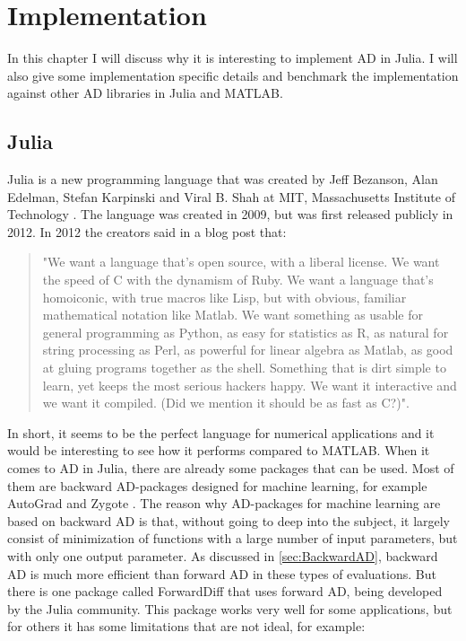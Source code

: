 \chapter{Implementation}
In this chapter I will discuss why it is interesting to implement AD in Julia. I will also give some implementation specific details and benchmark the implementation against other AD libraries in Julia and MATLAB.
\label{ch:Implementation}
\section{Julia}
\label{sec:Julia}
Julia is a new programming language that was created by Jeff Bezanson, Alan Edelman, Stefan Karpinski and Viral B. Shah at MIT, Massachusetts Institute of Technology \emph{\citep{juliaLab}}. The language was created in 2009, but was first released publicly in 2012. In 2012 the creators said in a blog post that:
\begin{quotation}
"We want a language that’s open source, with a liberal license. We want the speed of C with the dynamism of Ruby. We want a language that’s homoiconic, with true macros like Lisp, but with obvious, familiar mathematical notation like Matlab. We want something as usable for general programming as Python, as easy for statistics as R, as natural for string processing as Perl, as powerful for linear algebra as Matlab, as good at gluing programs together as the shell. Something that is dirt simple to learn, yet keeps the most serious hackers happy. We want it interactive and we want it compiled. (Did we mention it should be as fast as C?)"\emph{\citep{juliaBlogRelease2012}}.
\end{quotation}
In short, it seems to be the perfect language for numerical applications and it would be interesting to see how it performs compared to MATLAB. When it comes to AD in Julia, there are already some packages that can be used. Most of them are backward AD-packages designed for machine learning, for example AutoGrad \emph{\citep{knet2016mlsys}} and Zygote \emph{\citep{innes2018don}}. The reason why AD-packages for machine learning are based on backward AD is that, without going to deep into the subject, it largely consist of minimization of functions with a large number of input parameters, but with only one output parameter. As discussed in \autoref{sec:BackwardAD}, backward AD is much more efficient than forward AD in these types of evaluations. But there is one package called ForwardDiff \emph{\citep{ForwardDiff}} that uses forward AD, being developed by the Julia community. This package works very well for some applications, but for others it has some limitations that are not ideal, for example: 
